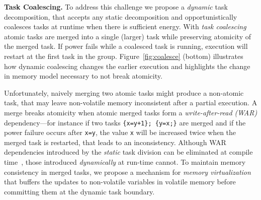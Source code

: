 \textbf{Task Coalescing.} To address this challenge we propose a \emph{dynamic} task decomposition, that accepts any static decomposition and opportunistically coalesces tasks at runtime when there is sufficient energy. With \emph{task coalescing} atomic tasks are merged into a single (larger) task while preserving atomicity of the merged task. If power fails while a coalesced task is running, execution will restart at the first task in the group. Figure~\ref{fig:coalesce} (bottom) illustrates how dynamic coalescing changes the earlier execution and highlights the change in memory model necessary to not break atomicity.

Unfortunately, naively merging two atomic tasks might produce a non-atomic task, that may leave non-volatile memory inconsistent after a partial execution. A merge breaks atomicity when atomic merged tasks form a \emph{write-after-read (WAR)} dependency---for instance if two tasks \texttt{\{x=y+1\}; \{y=x;\}} are merged and if the power failure occurs after \texttt{x=y}, the value \texttt{x} will be increased twice when the merged task is restarted, that leads to an inconsistency.
%
%
Although WAR dependencies introduced by the \emph{static} task division can be eliminated at compile time~\cite{alpaca}, those introduced \emph{dynamically} at
run-time cannot. To maintain memory consistency in merged tasks, we propose a
mechanism for \emph{memory virtualization} that buffers the updates to non-volatile variables in volatile memory before committing them at the dynamic task boundary.
%

